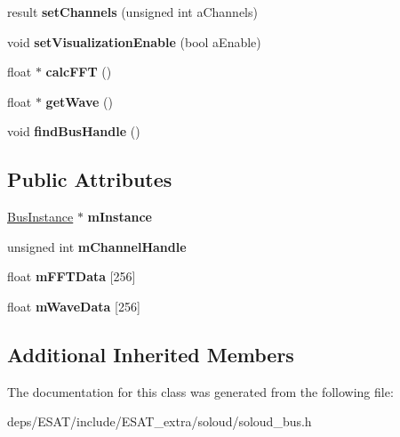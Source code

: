 \begin{DoxyCompactItemize}
result {\bfseries set\+Channels} (unsigned int a\+Channels)
\item 
\mbox{\label{class_so_loud_1_1_bus_a4367e7475af9b3bd5959dc103fd30e21}} 
void {\bfseries set\+Visualization\+Enable} (bool a\+Enable)
\item 
\mbox{\label{class_so_loud_1_1_bus_a22ff3334affcd26edb50d899da24224c}} 
float $\ast$ {\bfseries calc\+F\+FT} ()
\item 
\mbox{\label{class_so_loud_1_1_bus_a77dae82a61fcf934cb46572bda01f34f}} 
float $\ast$ {\bfseries get\+Wave} ()
\item 
\mbox{\label{class_so_loud_1_1_bus_a171589a229eab854123bf6f88086a5d1}} 
void {\bfseries find\+Bus\+Handle} ()
\end{DoxyCompactItemize}
\subsection*{Public Attributes}
\begin{DoxyCompactItemize}
\item 
\mbox{\label{class_so_loud_1_1_bus_aa4b3c29a794cfe468d6871f69a1f8e92}} 
\mbox{\hyperlink{class_so_loud_1_1_bus_instance}{Bus\+Instance}} $\ast$ {\bfseries m\+Instance}
\item 
\mbox{\label{class_so_loud_1_1_bus_a0e5ce0894c817cdd158922989bde0387}} 
unsigned int {\bfseries m\+Channel\+Handle}
\item 
\mbox{\label{class_so_loud_1_1_bus_a38a6d2c789a33659f07dd911b93327e3}} 
float {\bfseries m\+F\+F\+T\+Data} \mbox{[}256\mbox{]}
\item 
\mbox{\label{class_so_loud_1_1_bus_a722292f1f9cb03c851497a5e9cd9f551}} 
float {\bfseries m\+Wave\+Data} \mbox{[}256\mbox{]}
\end{DoxyCompactItemize}
\subsection*{Additional Inherited Members}


The documentation for this class was generated from the following file\+:\begin{DoxyCompactItemize}
\item 
deps/\+E\+S\+A\+T/include/\+E\+S\+A\+T\+\_\+extra/soloud/soloud\+\_\+bus.\+h\end{DoxyCompactItemize}
